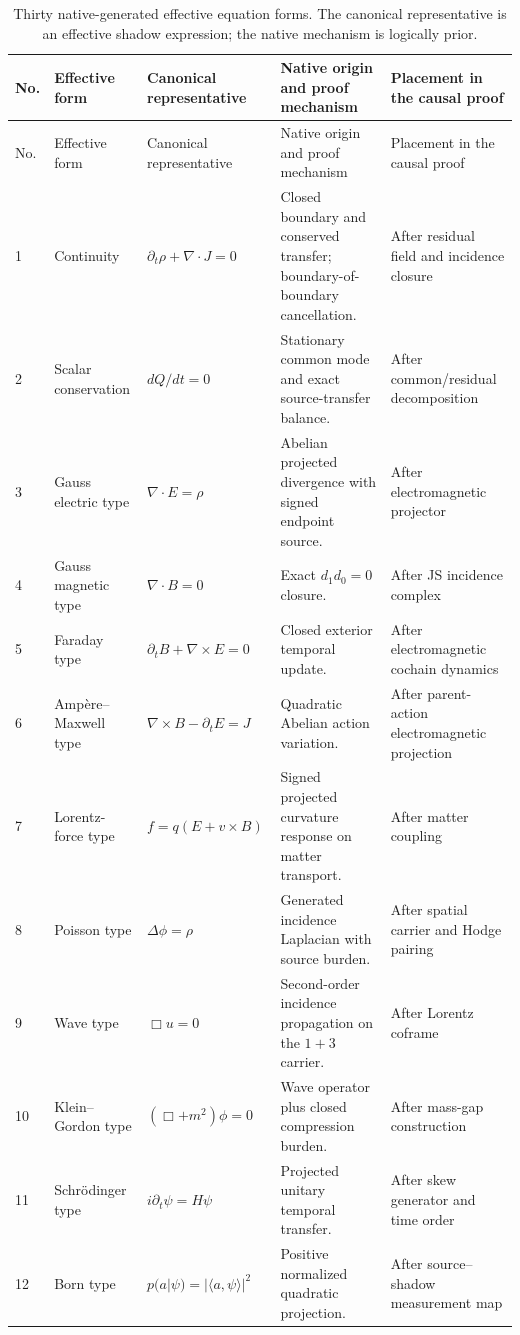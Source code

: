 \documentclass[11pt]{article}
\numberwithin{equation}{section}
\theoremstyle{remark}
\begin{document}
\begin{landscape}
\begin{longtable}{p{0.65cm}p{3.5cm}p{5.2cm}p{6.2cm}p{3.4cm}}
\caption{Thirty native-generated effective equation forms. The canonical representative is an effective shadow expression; the native mechanism is logically prior.}\label{tab:thirtyequations}\\
\toprule No. & Effective form & Canonical representative & Native origin and proof mechanism & Placement in the causal proof\\ \midrule
\endfirsthead
\toprule No. & Effective form & Canonical representative & Native origin and proof mechanism & Placement in the causal proof\\ \midrule
\endhead
1&Continuity&$\partial_t\rho+\nabla\!\cdot J=0$&Closed boundary and conserved transfer; boundary-of-boundary cancellation.&After residual field and incidence closure\\
2&Scalar conservation&$dQ/dt=0$&Stationary common mode and exact source-transfer balance.&After common/residual decomposition\\
3&Gauss electric type&$\nabla\!\cdot E=\rho$&Abelian projected divergence with signed endpoint source.&After electromagnetic projector\\
4&Gauss magnetic type&$\nabla\!\cdot B=0$&Exact $d_1d_0=0$ closure.&After JS incidence complex\\
5&Faraday type&$\partial_tB+\nabla\!\times E=0$&Closed exterior temporal update.&After electromagnetic cochain dynamics\\
6&Amp\`ere--Maxwell type&$\nabla\!\times B-\partial_tE=J$&Quadratic Abelian action variation.&After parent-action electromagnetic projection\\
7&Lorentz-force type&$f=q(E+v\times B)$&Signed projected curvature response on matter transport.&After matter coupling\\
8&Poisson type&$\Delta\phi=\rho$&Generated incidence Laplacian with source burden.&After spatial carrier and Hodge pairing\\
9&Wave type&$\Box u=0$&Second-order incidence propagation on the $1+3$ carrier.&After Lorentz coframe\\
10&Klein--Gordon type&$(\Box+m^2)\phi=0$&Wave operator plus closed compression burden.&After mass-gap construction\\
11&Schr\"odinger type&$i\partial_t\psi=H\psi$&Projected unitary temporal transfer.&After skew generator and time order\\
12&Born type&$p(a|\psi)=|\langle a,\psi\rangle|^2$&Positive normalized quadratic projection.&After source--shadow measurement map\\

\end{longtable}
\end{landscape}
\end{document}

